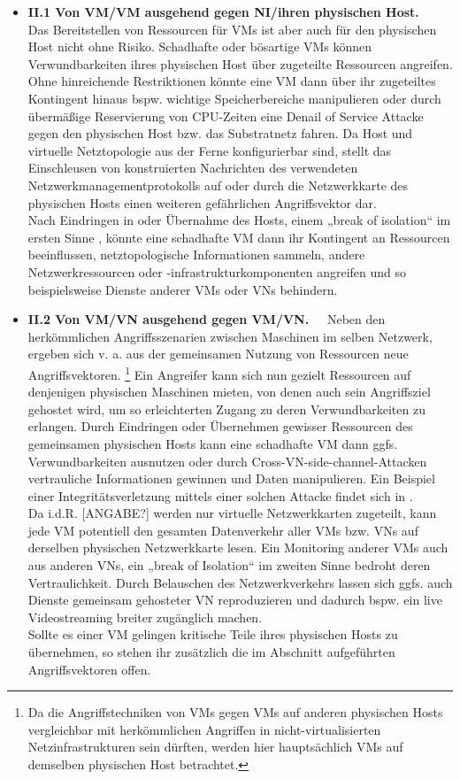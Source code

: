 \begin{itemize}
\item \textbf{II.1 Von VM/VM ausgehend gegen NI/ihren physischen Host.~~}
Das Bereitstellen von Ressourcen für VMs ist aber auch für den physischen Host nicht ohne Risiko. Schadhafte oder bösartige VMs können Verwundbarkeiten ihres physischen Host über zugeteilte Ressourcen angreifen. Ohne hinreichende Restriktionen könnte eine VM dann über ihr zugeteiltes Kontingent hinaus bspw. wichtige Speicherbereiche manipulieren oder durch übermäßige Reservierung von CPU-Zeiten eine Denail of Service Attacke gegen den physischen Host bzw. das Substratnetz fahren. Da Host und virtuelle Netztopologie aus der Ferne konfigurierbar sind, stellt das Einschleusen von konstruierten Nachrichten des verwendeten Netzwerkmanagementprotokolls auf oder durch die Netzwerkkarte des physischen Hosts einen weiteren gefährlichen Angriffsvektor dar.\\
Nach Eindringen in oder Übernahme des Hosts, einem „break of isolation“ im ersten Sinne \cite{wu2010network}, könnte eine schadhafte VM dann ihr Kontingent an Ressourcen beeinflussen, netztopologische Informationen sammeln, andere Netzwerkressourcen oder -infrastrukturkomponenten angreifen und so beispielsweise Dienste anderer VMs oder VNs behindern.

\item \textbf{II.2 Von VM/VN ausgehend gegen VM/VN.~~}
Neben den herkömmlichen Angriffsszenarien zwischen Maschinen im selben Netzwerk, ergeben sich v. a. aus der gemeinsamen Nutzung von Ressourcen neue Angriffsvektoren. 
\footnote{Da die Angriffstechniken von VMs gegen VMs auf anderen physischen Hosts vergleichbar mit herkömmlichen Angriffen in nicht-virtualisierten Netzinfrastrukturen sein dürften, werden hier hauptsächlich VMs auf demselben physischen Host betrachtet.} 
Ein Angreifer kann sich nun gezielt Ressourcen auf denjenigen physischen Maschinen mieten, von denen auch sein Angriffsziel gehostet wird, um so erleichterten Zugang zu deren Verwundbarkeiten zu erlangen. Durch Eindringen oder Übernehmen gewisser Ressourcen des gemeinsamen physischen Hosts kann eine schadhafte VM dann ggfs. Verwundbarkeiten ausnutzen oder durch Cross-VN-side-channel-Attacken vertrauliche Informationen gewinnen und Daten manipulieren. Ein Beispiel einer Integritätsverletzung mittels einer solchen Attacke findet sich in \cite{ristenpart2009hey}. \\
Da i.d.R. [ANGABE?] werden nur virtuelle Netzwerkkarten zugeteilt, kann jede VM potentiell den gesamten Datenverkehr aller VMs bzw. VNs auf derselben physischen Netzwerkkarte lesen. Ein Monitoring anderer VMs auch aus anderen VNs, ein „break of Isolation“ im zweiten Sinne bedroht deren Vertraulichkeit. Durch Belauschen des Netzwerkverkehrs lassen sich ggfs. auch Dienste gemeinsam gehosteter VN reproduzieren und dadurch bspw. ein live Videostreaming breiter zugänglich machen.\cite{natarajansecurity}\\
Sollte es einer VM gelingen kritische Teile ihres physischen Hosts zu übernehmen, so stehen ihr zusätzlich die im Abschnitt \textit{} aufgeführten Angriffsvektoren offen.



\end{itemize}
